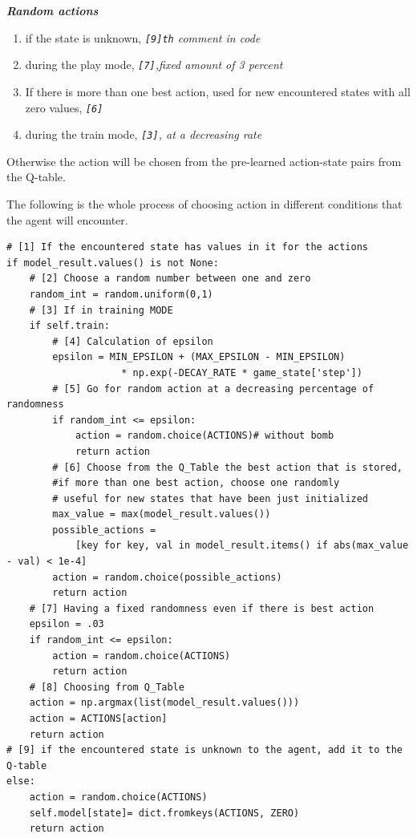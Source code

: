 \documentclass{article}
\begin{document}
\textbf{\textit{Random actions}}

\begin{enumerate}
    \item if the state is unknown, \textit{\texttt{[9]th} comment in code}
    \item during the play mode, \textit{\texttt{[7]},fixed amount of 3 percent}
    \item If there is more than one best action, used for new encountered states with all zero values, \textit{\texttt{[6]}}
    \item during the train mode, \textit{\texttt{[3]}, at a decreasing rate}
\end{enumerate}

Otherwise the action will be chosen from the pre-learned action-state pairs from the Q-table.

The following is the whole process of choosing action in different conditions that the agent will encounter.

\begin{verbatim}
# [1] If the encountered state has values in it for the actions
if model_result.values() is not None: 
    # [2] Choose a random number between one and zero 
    random_int = random.uniform(0,1)
    # [3] If in training MODE
    if self.train:
        # [4] Calculation of epsilon
        epsilon = MIN_EPSILON + (MAX_EPSILON - MIN_EPSILON) 
                    * np.exp(-DECAY_RATE * game_state['step'])
        # [5] Go for random action at a decreasing percentage of randomness
        if random_int <= epsilon: 
            action = random.choice(ACTIONS)# without bomb
            return action
        # [6] Choose from the Q_Table the best action that is stored,
        #if more than one best action, choose one randomly
        # useful for new states that have been just initialized
        max_value = max(model_result.values())
        possible_actions = 
            [key for key, val in model_result.items() if abs(max_value - val) < 1e-4]
        action = random.choice(possible_actions)
        return action
    # [7] Having a fixed randomness even if there is best action 
    epsilon = .03
    if random_int <= epsilon:
        action = random.choice(ACTIONS)
        return action
    # [8] Choosing from Q_Table
    action = np.argmax(list(model_result.values()))
    action = ACTIONS[action]
    return action
# [9] if the encountered state is unknown to the agent, add it to the Q-table
else:
    action = random.choice(ACTIONS)
    self.model[state]= dict.fromkeys(ACTIONS, ZERO)
    return action
\end{verbatim}
\end{document}
